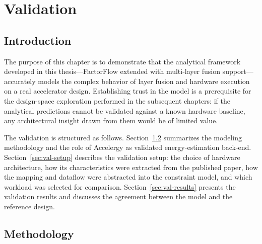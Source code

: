 \chapter{Validation}
\label{ch:validation}


\section{Introduction}
\label{sec:val-intro}

The purpose of this chapter is to demonstrate that the analytical
framework developed in this thesis---FactorFlow extended with multi-layer
fusion support---accurately models the complex behavior of layer fusion
and hardware execution on a real accelerator design.
Establishing trust in the model is a prerequisite for the design-space
exploration performed in the subsequent chapters: if the analytical
predictions cannot be validated against a known hardware baseline, any
architectural insight drawn from them would be of limited value.

The validation is structured as follows.
Section~\ref{sec:val-methodology} summarizes the modeling methodology
and the role of Accelergy as validated energy-estimation back-end.
Section~\ref{sec:val-setup} describes the validation setup: the choice
of hardware architecture, how its characteristics were extracted from
the published paper, how the mapping and dataflow were abstracted into
the constraint model, and which workload was selected for comparison.
Section~\ref{sec:val-results} presents the validation results and
discusses the agreement between the model and the reference design.


\section{Methodology}
\label{sec:val-methodology}

